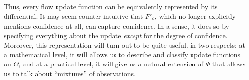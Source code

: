 Thus, every flow update function can be equivalently represented
by its differential.
% 
% 
It may seem counter-intuitive that $F'_\phi$,
which no longer explicitly mentions confidence at all,
can capture confidence. In a sense, it does so by specifying 
everything about the update \emph{except} for the degree of confidence.
Moreover, this representation will turn out to be quite useful, 
in two respects: at a mathematical level, it will allows us to
describe and classify update functions on $\Theta$, 
and at a practical level, it will give us a natural extension of $\Phi$
that allows us to talk about ``mixtures'' of observations. 

